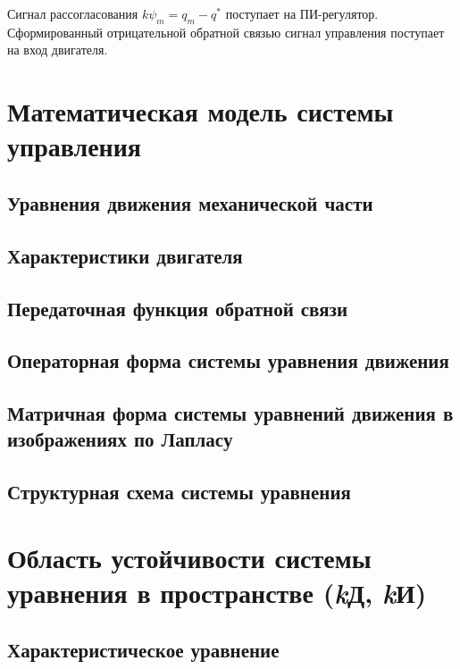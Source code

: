 \documentclass[14pt]{extreport}
\begin{document}
{Сигнал рассогласования $k \psi_m = q_m - q^*$ поступает на ПИ-регулятор.
Сформированный отрицательной обратной связью сигнал управления
поступает на вход двигателя.

        \newpage
        \section{Математическая модель системы управления}

        \subsection{Уравнения движения механической части}

        \subsection{Характеристики двигателя}

        \subsection{Передаточная функция обратной связи}

        \subsection{Операторная форма системы уравнения движения}

        \subsection{Матричная форма системы уравнений движения в изображениях по Лапласу}

        \subsection{Структурная схема системы уравнения}

        \newpage

        \section{Область устойчивости системы уравнения в пространстве (\textit{k}Д, \textit{k}И)}

        \subsection{Характеристическое уравнение}

}
\end{document}
